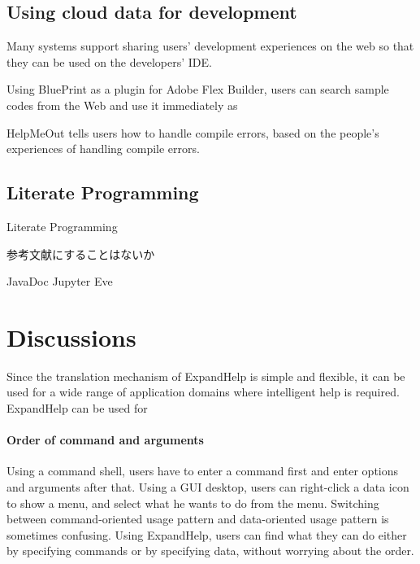 \documentclass{sigchi}
\def\EH{\textsf{ExpandHelp}}
\begin{document}
\subsection{Using cloud data for development}


Many systems support sharing users' development experiences on the web so that
they can be used on the developers' IDE.

Using BluePrint\cite{Brandt:2010:EPI:1753326.1753402}
as a plugin for Adobe Flex Builder,
users can search sample codes from the Web and use it immediately
as 


HelpMeOut\cite{Hartmann:2010:OPS:1753326.1753478} tells users
how to handle compile errors,
based on the people's experiences of handling compile errors.



% 
%

\subsection{Literate Programming}

Literate Programming\cite{Knuth}

参考文献にすることはないか

JavaDoc
Jupyter
Eve

\section{Discussions}

Since the translation mechanism of {\EH} is simple and flexible,
it can be used for a wide range of application domains where
intelligent help is required.
{\EH} can be used for 


\paragraph{Order of command and arguments}

Using a command shell,
users have to enter a command first and enter options and arguments after that.
Using a GUI desktop,
users can right-click a data icon to show a menu,
and select what he wants to do from the menu.
Switching between command-oriented usage pattern and
data-oriented usage pattern is sometimes confusing.
Using {\EH}, users can find what they can do
either by specifying commands or by specifying data, 
without worrying about the order.
\end{document}
